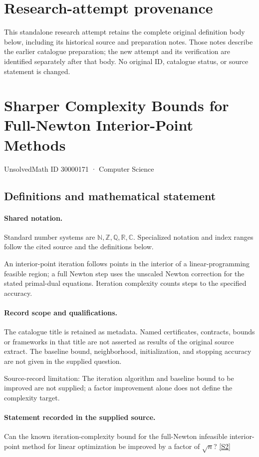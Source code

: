 \documentclass[11pt]{article}
\begin{document}
\section*{Research-attempt provenance}
This standalone research attempt retains the complete original definition body below,
including its historical source and preparation notes. Those notes describe the
earlier catalogue preparation; the new attempt and its verification are identified
separately after that body. No original ID, catalogue status, or source statement is changed.

\section{Sharper Complexity Bounds for Full-Newton Interior-Point Methods}\label{30000171}
{\small UnsolvedMath ID 30000171 · Computer Science}
\subsection{Definitions and mathematical statement}

\paragraph{Shared notation.}Standard number systems are $\mathbb N,\mathbb Z,\mathbb Q,\mathbb R,\mathbb C$. Specialized notation and index ranges follow the cited source and the definitions below.


An interior-point iteration follows points in the interior of a linear-programming feasible region; a full Newton step uses the unscaled Newton correction for the stated primal-dual equations. Iteration complexity counts steps to the specified accuracy.
\paragraph{Record scope and qualifications.}
The catalogue title is retained as metadata. Named certificates, contracts, bounds or frameworks in that title are not asserted as results of the original source extract.
The baseline bound, neighborhood, initialization, and stopping accuracy are not given in the supplied question.

Source-record limitation: The iteration algorithm and baseline bound to be improved are not supplied; a factor improvement alone does not define the complexity target.
\paragraph{Statement recorded in the supplied source.}
Can the known iteration-complexity bound for the full-Newton infeasible interior-point method for linear optimization be improved by a factor of $\sqrt n$? \href{https://doi.org/10.4171/owr/2005/02}{[S2]}
\end{document}
